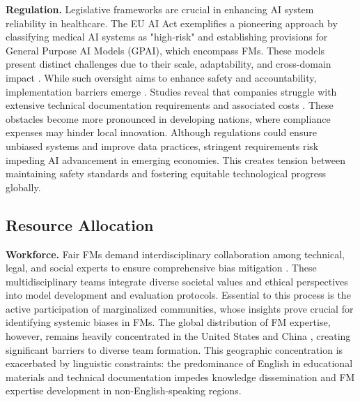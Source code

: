 \textbf{Regulation.} Legislative frameworks are crucial in enhancing AI system reliability in healthcare. The EU AI Act exemplifies a pioneering approach by classifying medical AI systems as "high-risk" and establishing provisions for General Purpose AI Models (GPAI), which encompass FMs. These models present distinct challenges due to their scale, adaptability, and cross-domain impact \cite{minssen_challenges_2023}. While such oversight aims to enhance safety and accountability, implementation barriers emerge \cite{aboy_navigating_2024}. Studies reveal that companies struggle with extensive technical documentation requirements and associated costs \cite{carl_impact_2024}. These obstacles become more pronounced in developing nations, where compliance expenses may hinder local innovation. Although regulations could ensure unbiased systems and improve data practices, stringent requirements risk impeding AI advancement in emerging economies. This creates tension between maintaining safety standards and fostering equitable technological progress globally.

\subsection{Resource Allocation}

\textbf{Workforce.} Fair FMs demand interdisciplinary collaboration among technical, legal, and social experts to ensure comprehensive bias mitigation \cite{lekadir_future-ai_2025, bengio_international_nodate}. These multidisciplinary teams integrate diverse societal values and ethical perspectives into model development and evaluation protocols. Essential to this process is the active participation of marginalized communities, whose insights prove crucial for identifying systemic biases in FMs. The global distribution of FM expertise, however, remains heavily concentrated in the United States and China \cite{alshebli_china_2024, zwetsloot_skilled_2021}, creating significant barriers to diverse team formation. This geographic concentration is exacerbated by linguistic constraints: the predominance of English in educational materials and technical documentation impedes knowledge dissemination and FM expertise development in non-English-speaking regions.


